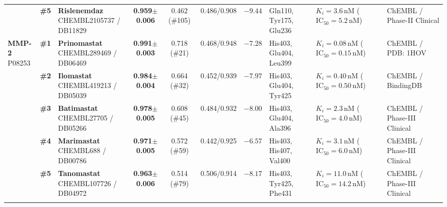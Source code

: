 \begin{table}[H]
{{\begin{tabular}{l c l c c c c l l l}
 & \textbf{\#5} & \parbox[t]{2.20cm}{\raggedright\textbf{Rislenemdaz}\newline CHEMBL2105737 / DB11829} & \textbf{0.959${\pm}$0.006} & 0.462 (\#105) & 0.486/0.908 & $-9.44$ & \parbox[t]{1.72cm}{\raggedright Gln110, Tyr175, Glu236} & \parbox[t]{1.92cm}{\raggedright $K_i = 3.6\,\mathrm{nM}$ ($\mathrm{IC}_{50} = 5.2\,\mathrm{nM}$)} & \parbox[t]{1.75cm}{\raggedright ChEMBL / Phase-II Clinical} \\\addlinespace[2.2pt]
\midrule
\parbox[t]{1.22cm}{\raggedright\textbf{MMP-2}\newline P08253} & \textbf{\#1} & \parbox[t]{2.20cm}{\raggedright\textbf{Prinomastat}\newline CHEMBL289469 / DB06469} & \textbf{0.991${\pm}$0.003} & 0.718 (\#21) & 0.468/0.948 & $-7.28$ & \parbox[t]{1.72cm}{\raggedright His403, Glu404, Leu399} & \parbox[t]{1.92cm}{\raggedright $K_i = 0.08\,\mathrm{nM}$ ($\mathrm{IC}_{50} = 0.15\,\mathrm{nM}$)} & \parbox[t]{1.75cm}{\raggedright ChEMBL / PDB: 1HOV} \\\addlinespace[2.2pt]
 & \textbf{\#2} & \parbox[t]{2.20cm}{\raggedright\textbf{Ilomastat}\newline CHEMBL419213 / DB05039} & \textbf{0.984${\pm}$0.004} & 0.664 (\#32) & 0.452/0.939 & $-7.97$ & \parbox[t]{1.72cm}{\raggedright His403, Glu404, Tyr425} & \parbox[t]{1.92cm}{\raggedright $K_i = 0.40\,\mathrm{nM}$ ($\mathrm{IC}_{50} = 0.50\,\mathrm{nM}$)} & \parbox[t]{1.75cm}{\raggedright ChEMBL / BindingDB} \\\addlinespace[2.2pt]
 & \textbf{\#3} & \parbox[t]{2.20cm}{\raggedright\textbf{Batimastat}\newline CHEMBL27705 / DB05266} & \textbf{0.978${\pm}$0.005} & 0.608 (\#45) & 0.484/0.932 & $-8.00$ & \parbox[t]{1.72cm}{\raggedright His403, Glu404, Ala396} & \parbox[t]{1.92cm}{\raggedright $K_i = 2.3\,\mathrm{nM}$ ($\mathrm{IC}_{50} = 4.0\,\mathrm{nM}$)} & \parbox[t]{1.75cm}{\raggedright ChEMBL / Phase-III Clinical} \\\addlinespace[2.2pt]
 & \textbf{\#4} & \parbox[t]{2.20cm}{\raggedright\textbf{Marimastat}\newline CHEMBL688 / DB00786} & \textbf{0.971${\pm}$0.005} & 0.572 (\#59) & 0.442/0.925 & $-6.57$ & \parbox[t]{1.72cm}{\raggedright His403, His407, Val400} & \parbox[t]{1.92cm}{\raggedright $K_i = 3.1\,\mathrm{nM}$ ($\mathrm{IC}_{50} = 6.0\,\mathrm{nM}$)} & \parbox[t]{1.75cm}{\raggedright ChEMBL / Phase-III Clinical} \\\addlinespace[2.2pt]
 & \textbf{\#5} & \parbox[t]{2.20cm}{\raggedright\textbf{Tanomastat}\newline CHEMBL107726 / DB04972} & \textbf{0.963${\pm}$0.006} & 0.514 (\#79) & 0.506/0.914 & $-8.17$ & \parbox[t]{1.72cm}{\raggedright His403, Tyr425, Phe431} & \parbox[t]{1.92cm}{\raggedright $K_i = 11.0\,\mathrm{nM}$ ($\mathrm{IC}_{50} = 14.2\,\mathrm{nM}$)} & \parbox[t]{1.75cm}{\raggedright ChEMBL / Phase-III Clinical} \\\addlinespace[2.2pt]
\bottomrule
\end{tabular}%
}}
\end{table}
